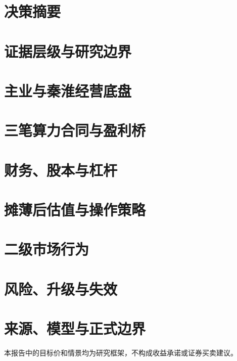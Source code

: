 \documentclass[a4paper,11pt,openany,fontset=none]{ctexrep}
\begin{document}
\astockcover
\tableofcontents
\clearpage
\chapter{决策摘要}
\chapter{证据层级与研究边界}
\chapter{主业与秦淮经营底盘}
\chapter{三笔算力合同与盈利桥}
\chapter{财务、股本与杠杆}
\chapter{摊薄后估值与操作策略}
\chapter{二级市场行为}
\chapter{风险、升级与失效}
\appendix
\chapter{来源、模型与正式边界}
\clearpage
\begin{disclosurebox}[免责声明]
\small 本报告中的目标价和情景均为研究框架，不构成收益承诺或证券买卖建议。
\end{disclosurebox}
\end{document}
